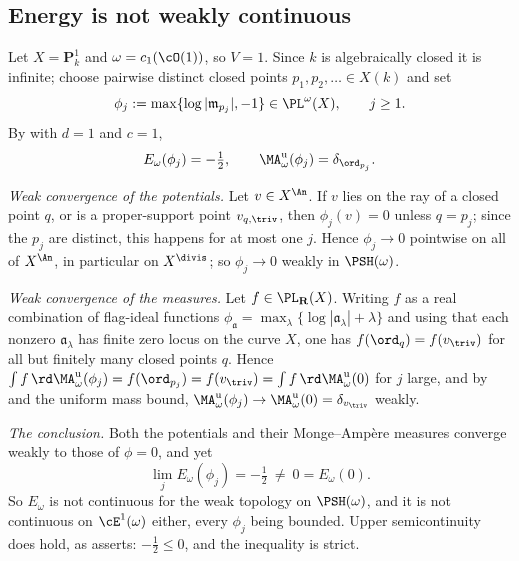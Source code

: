 \subsection{Energy is not weakly continuous}
\label{sec:ch46-not-continuous}

\begin{example}
\label{ex:ch46-energy-not-weakly-continuous}
Let $X=\mathbf P^1_k$ and $\omega=c_1(\cO(1))$, so $V=1$.  Since
$k$ is algebraically closed it is infinite; choose pairwise distinct
closed points $p_1,p_2,\dots\in X(k)$ and set
\[
 \phi_j:=\max\{\log|\mathfrak m_{p_j}|,-1\}\in\PL^{\omega}(X),
 \qquad j\ge1 .
\]
By  with $d=1$ and $c=1$,
\[
 E_\omega(\phi_j)=-\tfrac12,
 \qquad
 \MA^{\mathrm u}_\omega(\phi_j)=\delta_{\ord_{p_j}} .
\]

\emph{Weak convergence of the potentials.}  Let $v\in X^{\An}$.  If
$v$ lies on the ray of a closed point $q$, or is a proper-support point
$v_{q,\triv}$, then $\phi_j(v)=0$ unless $q=p_j$; since the $p_j$
are distinct, this happens for at most one $j$.  Hence
$\phi_j\to0$ pointwise on all of $X^{\An}$, in particular on
$X^{\divis}$; so $\phi_j\to0$ weakly in $\PSH(\omega)$.

\emph{Weak convergence of the measures.}  Let
$f\in\PL_{\mathbf R}(X)$.  Writing $f$ as a real combination of
flag-ideal functions $\phi_{\mathfrak a}
=\max_\lambda\{\log|\mathfrak a_\lambda|+\lambda\}$ and using that each
nonzero $\mathfrak a_\lambda$ has finite zero locus on the curve $X$,
one has $f(\ord_q)=f(v_{\triv})$ for all but finitely many closed points
$q$.  Hence $\int f\,\rd\MA^{\mathrm u}_\omega(\phi_j)=f(\ord_{p_j})
=f(v_{\triv})=\int f\,\rd\MA^{\mathrm u}_\omega(0)$ for $j$ large, and by
 and the uniform mass bound,
$\MA^{\mathrm u}_\omega(\phi_j)\to\MA^{\mathrm u}_\omega(0)
=\delta_{v_{\triv}}$ weakly.

\emph{The conclusion.}  Both the potentials and their Monge--Amp\`ere
measures converge weakly to those of $\phi=0$, and yet
\[
 \lim_jE_\omega(\phi_j)=-\tfrac12\ \ne\ 0=E_\omega(0).
\]
So $E_\omega$ is not continuous for the weak topology on
$\PSH(\omega)$, and it is not continuous on $\cE^1(\omega)$ either,
every $\phi_j$ being bounded.  Upper semicontinuity does hold, as
 asserts: $-\tfrac12\le0$, and the inequality
is strict.
\end{example}

